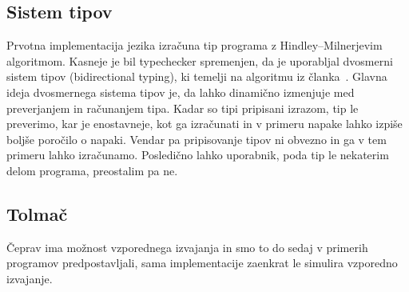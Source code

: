 \subsection{Sistem tipov}\label{sec:tipi}

Prvotna implementacija jezika \aeff izračuna tip programa z Hindley–Milnerjevim algoritmom. 
Kasneje je bil typechecker spremenjen, da je uporabljal dvosmerni sistem tipov (bidirectional typing), ki temelji na algoritmu iz članka~\cite{bidirectional}.
Glavna ideja dvosmernega sistema tipov je, da lahko dinamično izmenjuje med preverjanjem in računanjem tipa. Kadar so tipi pripisani izrazom, tip le preverimo, kar je enostavneje, kot ga izračunati in v primeru napake lahko izpiše boljše poročilo o napaki. Vendar pa pripisovanje tipov ni obvezno in ga v tem primeru lahko izračunamo. Posledično lahko uporabnik, poda tip le nekaterim delom programa, preostalim pa ne.

\subsection{Tolmač}\label{sec:interpreter}

Čeprav ima \aeff{} možnost vzporednega izvajanja in smo to do sedaj v primerih programov predpostavljali, sama implementacije zaenkrat le simulira vzporedno izvajanje.
